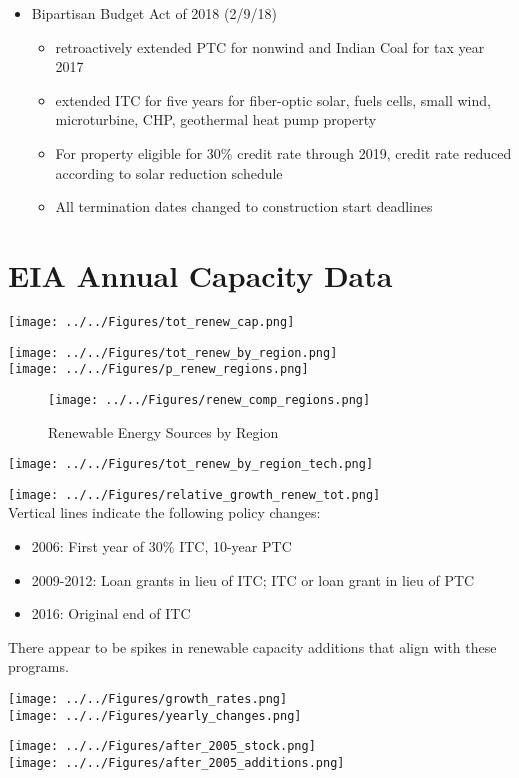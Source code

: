 \documentclass[11pt, oneside]{article}   	%
\begin{document}
\begin{itemize}
\item Bipartisan Budget Act of 2018 (2/9/18)
\begin{itemize}
\item retroactively extended PTC for nonwind and Indian Coal for tax year 2017
\item extended ITC for five years for fiber-optic solar, fuels cells, small wind, microturbine, CHP, geothermal heat pump property
\item For property eligible for 30\% credit rate through 2019, credit rate reduced according to solar reduction schedule
\item All termination dates changed to construction start deadlines
\end{itemize}
\end{itemize}

\section{EIA Annual Capacity Data}

\texttt{[image: ../../Figures/tot\_renew\_cap.png]}

\texttt{[image: ../../Figures/tot\_renew\_by\_region.png]}\\
\texttt{[image: ../../Figures/p\_renew\_regions.png]}

\begin{figure}
\caption{Renewable Energy Sources by Region}
\texttt{[image: ../../Figures/renew\_comp\_regions.png]}
\end{figure}
\newpage
\texttt{[image: ../../Figures/tot\_renew\_by\_region\_tech.png]}

\newpage

\texttt{[image: ../../Figures/relative\_growth\_renew\_tot.png]}
\\

Vertical lines indicate the following policy changes:
\begin{itemize}
\item  2006:  First year of 30\% ITC, 10-year PTC
\item 2009-2012: Loan grants in lieu of ITC; ITC or loan grant in lieu of PTC
\item  2016: Original end of ITC  
 \end{itemize}
There appear to be spikes in renewable capacity additions that align with these programs. 

\texttt{[image: ../../Figures/growth\_rates.png]}\\
\texttt{[image: ../../Figures/yearly\_changes.png]}



\newpage
\texttt{[image: ../../Figures/after\_2005\_stock.png]}\\
\texttt{[image: ../../Figures/after\_2005\_additions.png]}
\end{document}
